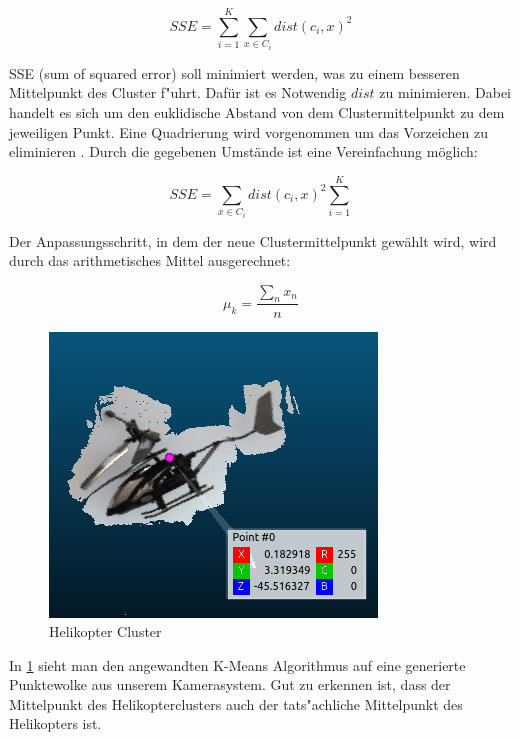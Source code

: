\begin{equation}
SSE=\sum_{i=1}^K \sum_{x \in C_i} dist(c_i, x)^{2}
\end{equation}

\noindent SSE (sum of squared error) soll minimiert werden, was zu einem besseren Mittelpunkt des Cluster f"uhrt. Dafür ist es Notwendig $dist$ zu minimieren. Dabei
handelt es sich um den euklidische Abstand von dem Clustermittelpunkt zu dem jeweiligen Punkt. Eine Quadrierung wird vorgenommen um das Vorzeichen zu eliminieren \cite{TUM}. Durch die gegebenen Umstände ist eine Vereinfachung möglich:\newline

\begin{equation}
SSE=\sum_{x \in C_i} dist(c_i, x)^{2} \sum_{i=1}^K
\end{equation}

\noindent Der Anpassungsschritt, in dem der neue Clustermittelpunkt gewählt wird, wird durch das arithmetisches Mittel ausgerechnet:

\begin{equation}
\mu_k = \dfrac{\sum_{n}x_{n}}{n}
\end{equation}

\begin{figure}[H]
	\includegraphics[scale=0.75]{bilder/helicloud}
	\caption[Helikopter Cluster]{Helikopter Cluster}
	\label{fig:helimeans}%
\end{figure}

\noindent In \ref{fig:helimeans} sieht man den angewandten K-Means Algorithmus auf eine generierte Punktewolke aus unserem Kamerasystem. Gut zu erkennen ist, dass der Mittelpunkt des Helikopterclusters auch der tats"achliche Mittelpunkt des Helikopters ist.
